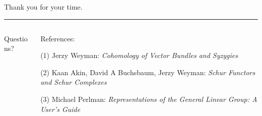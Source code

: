 \documentclass[mathserif]{beamer}
\begin{document}
%
\begin{frame}
    \begin{flushright}
        {\color{black!15!pastelblue}Thank you for your time.}
        \end{flushright}
        \hrule
    \begin{columns}
    \begin{column}{0.3\textwidth}
        \begin{block}{}{
        \begin{center}\Large  Questions?\end{center}}
        \end{block}\vspace{0em}
    \end{column}
    \begin{column}{0.7\textwidth}
        \begin{block}{}{
        \begin{center}\Large  References:\end{center}}
    \end{block}
(1) Jerzy Weyman: \textit{Cohomology of Vector Bundles and Syzygies}

(2) Kaan Akin, David A Buchsbaum, Jerzy Weyman: \textit{Schur Functors and Schur Complexes}

(3) Michael Perlman: \textit{Representations of the General Linear Group: A User's Guide}
    \end{column}
    \end{columns}
\end{frame}
\end{document}

